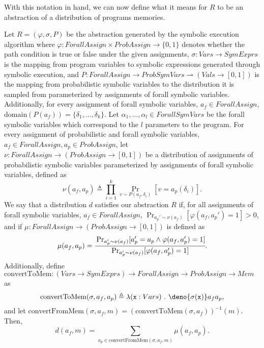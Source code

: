 \documentclass[acmsmall]{acmart}\settopmatter{}
\begin{document}
	With this notation in hand, we can now define what it means for $R$ to be an abstraction of a distribution of programs memories.
	
	\begin{definition}
		\label{def:combined}
		Let $R = (\varphi, \sigma, P)$ be the abstraction generated by the symbolic execution algorithm where $\varphi: ForallAssign \times ProbAssign \rightarrow \{0,1\}$ denotes whether the path condition is true or false under the given assignments, $\sigma : Vars \rightarrow SymExprs$ is the mapping from program variables to symbolic expressions generated through symbolic execution, and $P : ForallAssign \rightarrow ProbSymVars \rightharpoonup (Vals \rightarrow [0,1])$  is the mapping from probabilistic symbolic variables to the distribution it is sampled from parameterized by assignments of forall symbolic variables.
		Additionally, for every assignment of forall symbolic variables, $a_f \in ForallAssign$, $\mathrm{domain}(P(a_f)) = \{\delta_1,\ldots,\delta_k\}$.
		Let $\alpha_1,\ldots,\alpha_l \in ForallSymVars$ be the forall symbolic variables which correspond to the $l$ parameters to the program.
		For every assignment of probabilistic and forall symbolic variables, $a_f \in ForallAssign, a_p \in ProbAssign$, let $\nu : ForallAssign \rightarrow (ProbAssign \rightarrow [0,1])$ be a distribution of assignments of probabilistic symbolic variables parameterized by assignments of forall symbolic variables, defined as
		\[
		\nu(a_f,a_p) \triangleq \prod_{i=1}^k \Pr_{v \sim P(a_f,\delta_i)}[v = a_p(\delta_i)].
		\]
		We say that a distribution $d$ satisfies our abstraction $R$ if, for all assignments of forall symbolic variables, $a_f \in ForallAssign$, $\displaystyle\Pr_{a_p' \sim \nu(a_f)}[\varphi(a_f,a_p') = 1] > 0$, and if $\mu : ForallAssign \rightarrow (ProbAssign \rightarrow [0,1])$ is defined as 
		\[
		\mu(a_f,a_p) = \cfrac{\Pr_{a_p' \sim \nu(a_f)}[a_p' = a_p \land \varphi(a_f,a_p') = 1]}{\Pr_{a_p' \sim \nu(a_f)}[\varphi(a_f,a_p')=1]}.
		\]
		Additionally, define $\text{convertToMem} : (Vars \rightarrow SymExprs) \rightarrow ForallAssign \rightarrow ProbAssign \rightarrow Mem$ as
		\begin{equation*}
			\text{convertToMem}(\sigma,a_f,a_p) \triangleq \lambda (\mathtt{x}: Vars)~.~\deno{\sigma(\mathtt{x})}a_fa_p,
		\end{equation*}
		and let $\text{convertFromMem}(\sigma,a_f,m) = (\text{convertToMem}(\sigma,a_f))^{-1}(m)$.
		Then,
		\[
		d(a_f,m) = \sum_{a_p \in \text{convertFromMem}(\sigma,a_f,m)} \mu(a_f,a_p).
		\]
	\end{definition}
	
\end{document}
